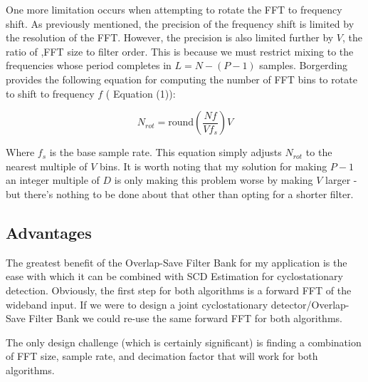 \documentclass[12pt]{report}
\begin{document}
One more limitation occurs when attempting to rotate the FFT to frequency
shift.  As previously mentioned, the precision of the frequency shift is
limited by the resolution of the FFT. However, the precision is also limited
further by $V$, the ratio of ,FFT size to filter order. This is because we must
restrict mixing to the frequencies whose period completes in $L=N-(P-1)$
samples. Borgerding provides the following equation for computing the number of
FFT bins to rotate to shift to frequency $f$ (\cite{Borgerding1} Equation (1)):

\begin{equation*}
    N_{rot} = \text{round}\left( \frac{Nf}{Vf_s} \right) V
\end{equation*}

Where $f_s$ is the base sample rate. This equation simply adjusts $N_{rot}$ to
the nearest multiple of $V$ bins. It is worth noting that my solution for
making $P-1$ an integer multiple of $D$ is only making this problem worse by
making $V$ larger - but there's nothing to be done about that other than opting
for a shorter filter.

\subsection{Advantages}
\label{sec:os_advantages}

The greatest benefit of the Overlap-Save Filter Bank for my application is
the ease with which it can be combined with SCD Estimation for cyclostationary
detection. Obviously, the first step for both algorithms is a forward FFT of the
wideband input. If we were to design a joint cyclostationary
detector/Overlap-Save Filter Bank we could re-use the same forward FFT for both
algorithms.

The only design challenge (which is certainly significant) is finding
a combination of FFT size, sample rate, and decimation factor that will work
for both algorithms.


\end{document}
